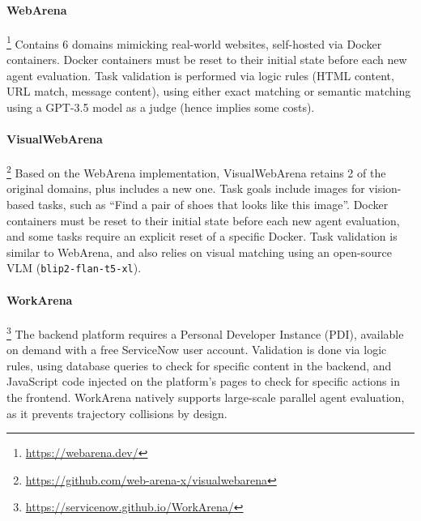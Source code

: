 \documentclass[10pt]{article} %
\begin{document}
\paragraph{WebArena}\footnote{\url{https://webarena.dev/}} \citep{webarena} Contains 6 domains mimicking real-world websites, self-hosted via Docker containers. Docker containers must be reset to their initial state before each new agent evaluation. Task validation is performed via logic rules (HTML content, URL match, message content), using either exact matching or semantic matching using a GPT-3.5 model as a judge (hence implies some costs).

\paragraph{VisualWebArena}\footnote{\url{https://github.com/web-arena-x/visualwebarena}} \citep{visual-webarena} Based on the WebArena implementation, VisualWebArena retains 2 of the original domains, plus includes a new one. Task goals include images for vision-based tasks, such as ``Find a pair of shoes that looks like this image''. Docker containers must be reset to their initial state before each new agent evaluation, and some tasks require an explicit reset of a specific Docker. Task validation is similar to WebArena, and also relies on visual matching using an open-source VLM (\texttt{blip2-flan-t5-xl}). 

\paragraph{WorkArena}\footnote{\url{https://servicenow.github.io/WorkArena/}} \citep{workarena, workarena-plus-plus} The backend platform requires a Personal Developer Instance (PDI), available on demand with a free ServiceNow user account. Validation is done via logic rules, using database queries to check for specific content in the backend, and JavaScript code injected on the platform's pages to check for specific actions in the frontend. WorkArena natively supports large-scale parallel agent evaluation, as it prevents trajectory collisions by design.
\end{document}
